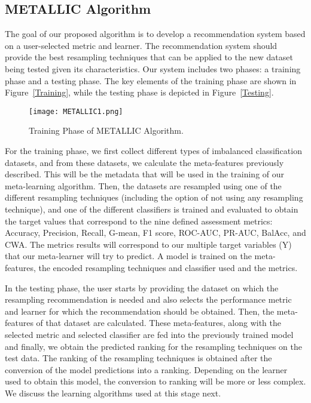 \documentclass{article}
\begin{document}
\subsection{METALLIC Algorithm}\label{subsec:algs}
The goal of our proposed algorithm is to develop a recommendation system based on a user-selected metric and learner. The recommendation system should provide the best resampling techniques that can be applied to the new dataset being tested given its characteristics. Our system includes two phases: a training phase and a testing phase. The key elements of the training phase are shown in Figure~\autoref{Training}, while the testing phase is depicted in Figure~\autoref{Testing}. 

\begin{figure}[!hbt]
\texttt{[image: METALLIC1.png]}
\centering
\caption{Training Phase of METALLIC Algorithm.}\label{Training}
\end{figure}


\begin{tikzpicture} 
\end{tikzpicture}

For the training phase, we first collect different types of imbalanced classification datasets, and from these datasets, we calculate the meta-features previously described. This will be the metadata that will be used in the training of our meta-learning algorithm. Then, the datasets are resampled using one of the different resampling techniques (including the option of not using any resampling technique), and one of the different classifiers is trained and evaluated to obtain the target values that correspond to the nine defined assessment metrics: Accuracy, Precision, Recall, G-mean, F1 score, ROC-AUC, PR-AUC, BalAcc, and CWA. The metrics results will correspond to our multiple target variables (Y) that our meta-learner will try to predict. A model is trained on the meta-features, the encoded resampling techniques and classifier used and the metrics.

In the testing phase, the user starts by providing the dataset on which the resampling recommendation is needed and also selects the performance metric and learner for which the recommendation should be obtained. Then, the meta-features of that dataset are calculated. These meta-features, along with the selected metric and selected classifier are fed into the previously trained model and finally, we obtain the predicted ranking for the resampling techniques on the test data. The ranking of the resampling techniques is obtained after the conversion of the model predictions into a ranking. Depending on the learner used to obtain this model, the conversion to ranking will be more or less complex. We discuss the learning algorithms used at this stage next.
\end{document}
